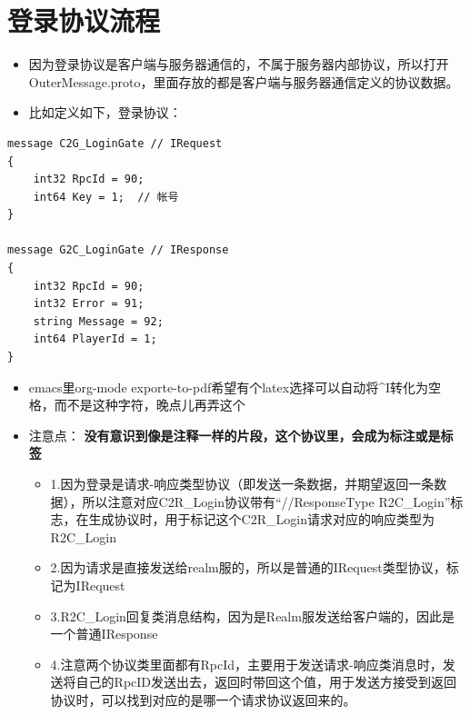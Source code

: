 \documentclass[9pt, b5paper]{article}
\begin{document}
\section{登录协议流程}
\label{sec-3}
\begin{itemize}
\item 因为登录协议是客户端与服务器通信的，不属于服务器内部协议，所以打开OuterMessage.proto，里面存放的都是客户端与服务器通信定义的协议数据。
\item 比如定义如下，登录协议：
\end{itemize}
\begin{verbatim}
message C2G_LoginGate // IRequest
{
	int32 RpcId = 90;
	int64 Key = 1;	// 帐号
}

message G2C_LoginGate // IResponse
{
	int32 RpcId = 90;
	int32 Error = 91;
	string Message = 92;
	int64 PlayerId = 1;
}
\end{verbatim}
\begin{itemize}
\item emacs里org-mode exporte-to-pdf希望有个latex选择可以自动将\^{}I转化为空格，而不是这种字符，晚点儿再弄这个
\item 注意点： \textbf{没有意识到像是注释一样的片段，这个协议里，会成为标注或是标签}
\begin{itemize}
\item 1.因为登录是请求-响应类型协议（即发送一条数据，并期望返回一条数据），所以注意对应C2R\_Login协议带有“//ResponseType R2C\_Login”标志，在生成协议时，用于标记这个C2R\_Login请求对应的响应类型为R2C\_Login
\item 2.因为请求是直接发送给realm服的，所以是普通的IRequest类型协议，标记为IRequest
\item 3.R2C\_Login回复类消息结构，因为是Realm服发送给客户端的，因此是一个普通IResponse
\item 4.注意两个协议类里面都有RpcId，主要用于发送请求-响应类消息时，发送将自己的RpcID发送出去，返回时带回这个值，用于发送方接受到返回协议时，可以找到对应的是哪一个请求协议返回来的。
\end{itemize}
\end{itemize}
\end{document}
